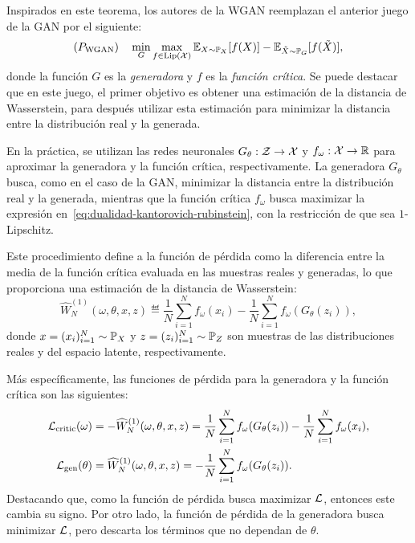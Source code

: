 Inspirados en este teorema, los autores de la WGAN \cite{arjovsky2017wasserstein} reemplazan el anterior juego de la GAN por el siguiente:
\begin{equation}\label{eq:wgan-game}
	(P_{\mathrm{WGAN}}) \quad \min_{G} \max_{f \in \Lip[\cX]} \Exp_{X\sim \Prob_X} [f(X)] - \Exp_{\tilde X \sim \Prob_G} [f(\tilde X)],
\end{equation}
donde la función $G$ es la \textit{generadora} y $f$ es la \textit{función crítica}. Se puede destacar que en este juego, el primer objetivo es obtener una estimación de la distancia de Wasserstein, para después utilizar esta estimación para minimizar la distancia entre la distribución real y la generada.

En la práctica, se utilizan las redes neuronales $G_\theta: \mathcal{Z} \to \mathcal{X}$ y $f_\omega: \mathcal{X} \to \mathbb{R}$ para aproximar la generadora y la función crítica, respectivamente.
La generadora $G_\theta$ busca, como en el caso de la GAN, minimizar la distancia entre la distribución real y la generada, mientras que la función crítica $f_\omega$ busca maximizar la expresión en~\eqref{eq:dualidad-kantorovich-rubinstein}, con la restricción de que sea $1$-Lipschitz.

Este procedimiento define a la función de pérdida como
la diferencia entre la media de la función crítica evaluada en las muestras reales y generadas, lo que proporciona una estimación de la distancia de Wasserstein:
\begin{equation}\label{eq:wasserstein-estimation}
	\widehat W_N^{(1)} (
	\omega, \theta, x, z
	)
	\eqdef \frac{1}{N}\sum_{i=1}^{N} f_\omega(x_i) - \frac{1}{N}\sum_{i=1}^{N} f_\omega(G_\theta(z_i)),
\end{equation}
donde $x = (x_i)_{i=1}^{N} \sim \Prob_X$ y $z = (z_i)_{i=1}^{N} \sim \Prob_Z$ son muestras de las distribuciones reales y del espacio latente, respectivamente.

Más específicamente, las funciones de pérdida para la generadora y la función crítica son las siguientes:
\begin{align}
	\mathcal{L}_{\mathrm{critic}}(\omega)
	 & = -\widehat W_N^{(1)} (
	\omega, \theta, x, z
	)
	= \frac{1}{N}\sum_{i=1}^{N} f_\omega(G_\theta(z_i)) - \frac{1}{N}\sum_{i=1}^{N} f_\omega(x_i),
	\\ \mathcal{L}_{\mathrm{gen}}(\theta)
	 & = \widehat W_N^{(1)} (
	\omega, \theta, x, z
	)
	= -\frac{1}{N}\sum_{i=1}^{N} f_\omega(G_\theta(z_i)).
\end{align}
Destacando que, como la función de pérdida busca maximizar $\mathcal{L}$, entonces este cambia su signo. Por otro lado, la función de pérdida de la generadora busca minimizar $\mathcal{L}$, pero descarta los términos que no dependan de $\theta$.

